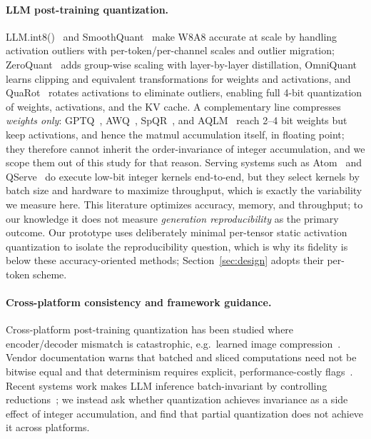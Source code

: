 \documentclass[wcp]{jmlr}
\begin{document}
\paragraph{LLM post-training quantization.} LLM.int8()~\citep{dettmers2022llmint8}
and SmoothQuant~\citep{xiao2023smoothquant} make W8A8 accurate at scale by handling
activation outliers with per-token/per-channel scales and outlier migration;
ZeroQuant~\citep{yao2022zeroquant} adds group-wise scaling with layer-by-layer
distillation, OmniQuant~\citep{shao2024omniquant} learns clipping and equivalent
transformations for weights and activations, and QuaRot~\citep{ashkboos2024quarot}
rotates activations to eliminate outliers, enabling full 4-bit quantization of
weights, activations, and the KV cache. A complementary line compresses
\emph{weights only}: GPTQ~\citep{frantar2023gptq}, AWQ~\citep{lin2024awq},
SpQR~\citep{dettmers2024spqr}, and AQLM~\citep{egiazarian2024aqlm} reach 2--4 bit
weights but keep activations, and hence the matmul accumulation itself, in floating
point; they therefore cannot inherit the order-invariance of integer accumulation,
and we scope them out of this study for that reason. Serving systems such as
Atom~\citep{zhao2024atom} and QServe~\citep{lin2025qserve} do execute low-bit
integer kernels end-to-end, but they select kernels by batch size and hardware to
maximize throughput, which is exactly the variability we measure here. This
literature optimizes accuracy, memory, and throughput; to our knowledge it does not
measure \emph{generation reproducibility} as the primary outcome. Our prototype
uses deliberately minimal per-tensor static activation quantization to isolate the
reproducibility question, which is why its fidelity is below these accuracy-oriented
methods; Section~\ref{sec:design} adopts their per-token scheme.

\paragraph{Cross-platform consistency and framework guidance.} Cross-platform
post-training quantization has been studied where encoder/decoder mismatch is
catastrophic, e.g.\ learned image compression~\citep{yu2022crossplatform}. Vendor
documentation warns that batched and sliced computations need not be bitwise equal
and that determinism requires explicit, performance-costly
flags~\citep{pytorch_numerical,pytorch_reproducibility}. Recent systems work makes
LLM inference batch-invariant by controlling reductions~\citep{he2025nondeterminism};
we instead ask whether quantization achieves invariance as a side effect of integer
accumulation, and find that partial quantization does not achieve it across
platforms.
\end{document}
